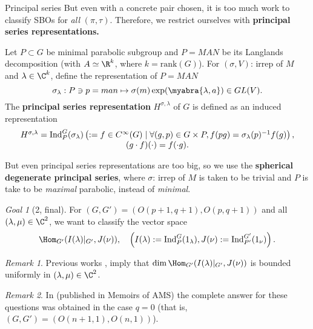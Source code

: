 \documentclass[pdf]{beamer}
\newcommand{\Ind}{\ensuremath{\operatorname{Ind}}}
\theoremstyle{mystyle}
\theoremstyle{remark}
\newtheorem{remark}{Remark}
\newtheorem{goal}{Goal}[section]
\begin{document}
\begin{frame}{Principal series}
	But even with a concrete pair chosen, it is too much work to classify SBOs for {\it all} $(\pi,\tau)$. Therefore, we restrict ourselves
	with {\bf principal series representations.}
	\begin{definition}
		Let $P\subset G$ be minimal parabolic subgroup and $P=M A N$ be its Langlands decomposition (with $A\simeq \R^k$, where $k=\mbox{rank}(G)$). 
		For $(\sigma,V)$: irrep of $M$ and $\lambda\in\C^k$, define
		the representation of $P=MAN$\begin{equation*}
				\sigma_\lambda:P\ni p=m a n\mapsto \sigma(m)\exp(\myabra{\lambda,a})\in GL(V).
		\end{equation*}
		The {\bf principal series representation} $H^{\sigma,\lambda}$ of $G$ is defined as an induced representation\begin{equation*}
			\begin{array}[]{c}
				H^{\sigma,\lambda}=\Ind_P^G(\sigma_\lambda)\left( :={f\in C^\infty(G)\mid \forall(g,p)\in G\times P,f(p g)=\sigma_\lambda(p)^{-1}f(g)} \right),\\
			(g\cdot f)(\cdot)=f(\cdot g).
			\end{array}
		\end{equation*}
	\end{definition}
\end{frame}
\begin{frame}
	But even principal series representations are too big, so we use the {\bf spherical degenerate principal series}, where $\sigma$: irrep of $M$ is taken to be trivial
	and $P$ is take to be {\it maximal} parabolic, instead of {\it minimal}.
	\begin{goal}[2, final]
		For $(G,G')=(O(p+1,q+1),O(p,q+1))$ and all $(\lambda,\mu)\in\C^2$, we want to classify the vector space
		\vspace{-0.4cm}
		\begin{equation*}
			\Hom_{G'}(I(\lambda)\kern-0.1cm\mid_{G'},J(\nu)),\quad \left( I(\lambda):=\Ind_P^G(1_\lambda),J(\nu):=\Ind_{P'}^{G'}(1_\nu) \right).
		\end{equation*}
	\end{goal}
	\begin{remark}
		Previous works \cite{kobayashi2014classification}, \cite{kobayashi2013finite} imply that $\dim\Hom_{G'}(I(\lambda)\kern-0.1cm\mid_{G'},J(\nu))$ is
		bounded uniformly in $(\lambda,\mu)\in\C^2$.
	\end{remark}
	\vspace{-0.2cm}
	\begin{remark}
		In \cite{kobayashi2015symmetry} (published in Memoirs of AMS) the complete answer for these questions was obtained in the case $q=0$ (that is, $(G,G')=(O(n+1,1),O(n,1))$).
	\end{remark}
\end{frame}
\end{document}

